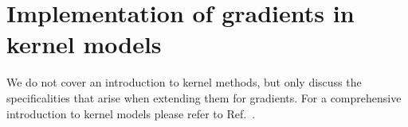 \section{Implementation of gradients in kernel models}
We do not cover an introduction to kernel methods, but only discuss the specificalities that arise when extending them for gradients.
For a comprehensive introduction to kernel models please refer to Ref.~\cite{bishop2006pattern}.

